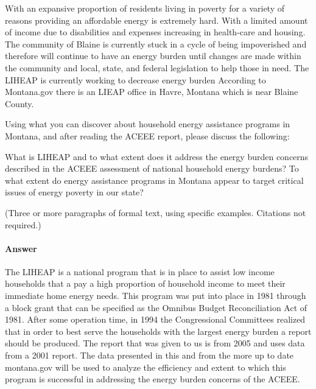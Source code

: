 \documentclass{article}
\begin{document}
With an expansive proportion of residents living in poverty for a variety of
reasons providing an affordable energy is extremely hard. With a limited amount of income due to
disabilities and expenses increasing in health-care and housing. The community
of Blaine is currently stuck in a cycle of being impoverished and therefore
will continue to have an energy burden until changes are made within the
community and local, state, and federal legislation to help those in need. The
LIHEAP is currently working to decrease energy burden
According to Montana.gov there is an LIEAP office in Havre, Montana which is
near Blaine County.


 

Using what you can discover about household energy assistance programs in
Montana, and after reading the ACEEE report, please discuss the following:

What is LIHEAP and to what extent does it address the energy burden concerns
described in the ACEEE assessment of national household energy burdens? To what
extent do energy assistance programs in Montana appear to target critical issues
of energy poverty in our state?

(Three or more paragraphs of formal text, using specific examples.
Citations not required.)
\paragraph{Answer}
The LIHEAP is a national program that is in place to assist low income
households that a pay a high proportion of household income to meet their
immediate home energy needs. This program was put into place in 1981 through
a block grant that can be specified as the Omnibus Budget Reconciliation Act of
1981. After some operation time, in 1994 the Congressional Committees realized
that in order to best serve the households with the largest energy burden a
report should be produced. The report that was given to us is from 2005 and uses
data from a 2001 report. The data presented in this and from the more up to date
montana.gov will be used to analyze the efficiency and extent to which this
program is successful in addressing the energy burden concerns of the ACEEE.
\end{document}
